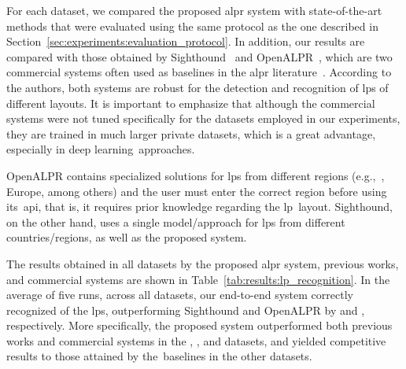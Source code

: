For each dataset, we compared the proposed \gls*{alpr} system with state-of-the-art methods that were evaluated using the same protocol as the one described in Section~\ref{sec:experiments:evaluation_protocol}. In addition, our results are compared with those obtained by Sighthound~\citep{masood2017sighthound} and OpenALPR~\citep{openalprapi}, which are two commercial systems often used as baselines in the \gls*{alpr} literature~\cite{spanhel2017holistic,laroca2018robust,goncalves2018realtime,silva2018license,silva2020realtime}.
According to the authors, both systems are robust for the detection and recognition of \glspl*{lp} of different layouts. 
It is important to emphasize that although the commercial systems were not tuned specifically for the datasets employed in our experiments, they are trained in much larger private datasets, which is a great advantage, especially in deep learning~approaches.

OpenALPR contains specialized solutions for \glspl*{lp} from different regions (e.g.,~, Europe, among others) and the user must enter the correct region before using its~\acrshort*{api}, that is, it requires prior knowledge regarding the \gls*{lp}~layout. Sighthound, on the other hand, uses a single model/approach for \glspl*{lp} from different countries/regions, as well as the proposed system.



The results obtained in all datasets by the proposed \gls*{alpr} system, previous works, and commercial systems are shown in Table~\ref{tab:results:lp_recognition}.
In the average of five runs, across all datasets, our end-to-end system correctly recognized \accavgmath of the \glspl*{lp}, outperforming Sighthound and OpenALPR by \outsighthound and \outopenalpr, respectively.
More specifically, the proposed system outperformed both previous works and commercial systems in the \chinese, \openalpreu, \ssig and \dataset datasets, and yielded competitive results to those attained by the~baselines in the other datasets. 

